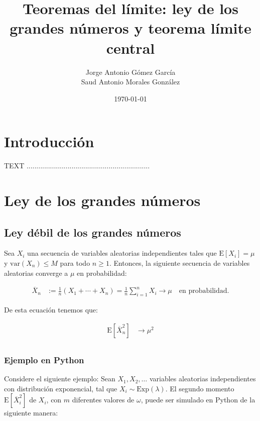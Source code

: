 \documentclass[8pt]{article}
\title{Teoremas del límite: ley de los grandes números y teorema límite central}
\author{Jorge Antonio Gómez García \\ Saud Antonio Morales González}
\date{\today}
\begin{document}
\maketitle
\tableofcontents
\pagebreak




\section{Introducción}
TEXT ...............................................................



\section{Ley de los grandes números}


\subsection{Ley débil de los grandes números}

Sea $X_i$ una secuencia de variables aleatorias independientes tales que $\text{E}[X_i] = \mu$ y $\text{var}(X_n) \leq M$ para todo $n \geq 1$. Entonces, la siguiente secuencia de variables aleatorias converge a $\mu$ en probabilidad:

\begin{align*}
    \overline{X}_n &:= \frac{1}{n}(X_1 + \cdots + X_n) = \frac{1}{n}\sum_{i=1}^n X_i \longrightarrow \mu \quad \text{en probabilidad}.
\end{align*}

De esta ecuación tenemos que:

\begin{align*}
    \text{E}[\overline{X}^2_n] &\rightarrow \mu^2 \\
\end{align*}

\subsubsection{Ejemplo en Python}

Considere el siguiente ejemplo: Sean $X_1, X_2, \ldots$ variables aleatorias independientes con distribución exponencial, tal que $X_i \sim \text{Exp}(\lambda)$. El segundo momento $\text{E}[\overline{X}^2_i]$ de $X_i$, con $m$ diferentes valores de $\omega$, puede ser simulado en Python de la siguiente manera:
\end{document}
